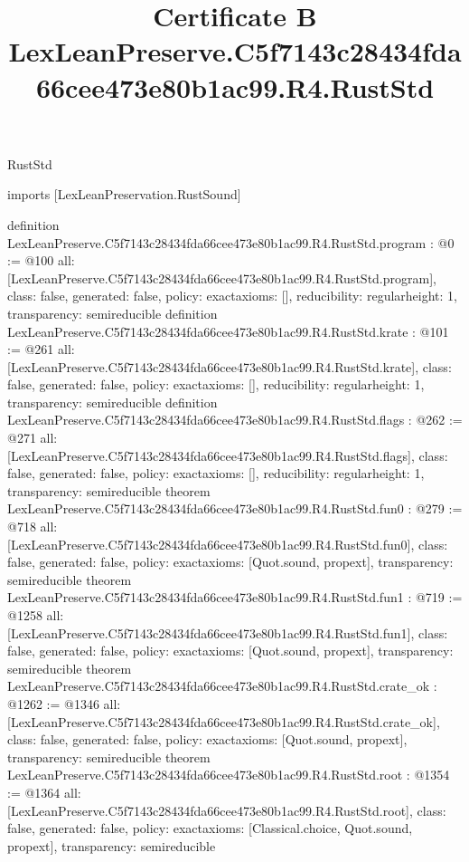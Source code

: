 \begin{lexlean}{RustStd}
\title{Certificate B LexLeanPreserve.C5f7143c28434fda66cee473e80b1ac99.R4.RustStd}
\begin{coremodule}
imports [LexLeanPreservation.RustSound]

definition LexLeanPreserve.C5f7143c28434fda66cee473e80b1ac99.R4.RustStd.program : @0 := @100 {
  all: [LexLeanPreserve.C5f7143c28434fda66cee473e80b1ac99.R4.RustStd.program],
  class: false,
  generated: false,
  policy: exact{axioms: []},
  reducibility: regular{height: 1},
  transparency: semireducible
}
definition LexLeanPreserve.C5f7143c28434fda66cee473e80b1ac99.R4.RustStd.krate : @101 := @261 {
  all: [LexLeanPreserve.C5f7143c28434fda66cee473e80b1ac99.R4.RustStd.krate],
  class: false,
  generated: false,
  policy: exact{axioms: []},
  reducibility: regular{height: 1},
  transparency: semireducible
}
definition LexLeanPreserve.C5f7143c28434fda66cee473e80b1ac99.R4.RustStd.flags : @262 := @271 {
  all: [LexLeanPreserve.C5f7143c28434fda66cee473e80b1ac99.R4.RustStd.flags],
  class: false,
  generated: false,
  policy: exact{axioms: []},
  reducibility: regular{height: 1},
  transparency: semireducible
}
theorem LexLeanPreserve.C5f7143c28434fda66cee473e80b1ac99.R4.RustStd.fun0 : @279 := @718 {
  all: [LexLeanPreserve.C5f7143c28434fda66cee473e80b1ac99.R4.RustStd.fun0],
  class: false,
  generated: false,
  policy: exact{axioms: [Quot.sound, propext]},
  transparency: semireducible
}
theorem LexLeanPreserve.C5f7143c28434fda66cee473e80b1ac99.R4.RustStd.fun1 : @719 := @1258 {
  all: [LexLeanPreserve.C5f7143c28434fda66cee473e80b1ac99.R4.RustStd.fun1],
  class: false,
  generated: false,
  policy: exact{axioms: [Quot.sound, propext]},
  transparency: semireducible
}
theorem LexLeanPreserve.C5f7143c28434fda66cee473e80b1ac99.R4.RustStd.crate_ok : @1262 := @1346 {
  all: [LexLeanPreserve.C5f7143c28434fda66cee473e80b1ac99.R4.RustStd.crate_ok],
  class: false,
  generated: false,
  policy: exact{axioms: [Quot.sound, propext]},
  transparency: semireducible
}
theorem LexLeanPreserve.C5f7143c28434fda66cee473e80b1ac99.R4.RustStd.root : @1354 := @1364 {
  all: [LexLeanPreserve.C5f7143c28434fda66cee473e80b1ac99.R4.RustStd.root],
  class: false,
  generated: false,
  policy: exact{axioms: [Classical.choice, Quot.sound, propext]},
  transparency: semireducible
}


\end{coremodule}
\end{lexlean}
